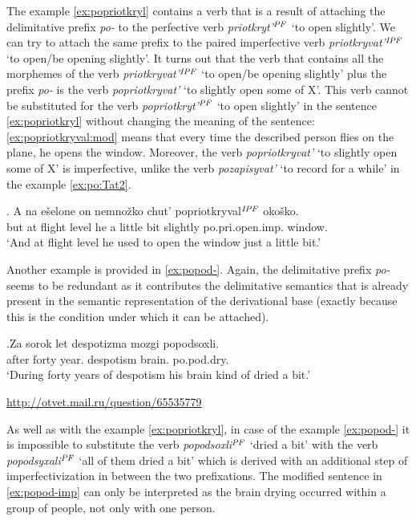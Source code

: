 The example \ref{ex:popriotkryl} contains a verb that is a result of attaching the delimitative prefix \textit{po-} to the perfective verb \textit{priotkryt'$^{\mathit{PF}}$} `to open slightly'. We can try to attach the same prefix to the paired imperfective verb \textit{priotkryvat'}$^{\mathit{IPF}}$ `to open/be opening slightly'. It turns out that the verb that contains all the morphemes of the verb \textit{priotkryvat'}$^{\mathit{IPF}}$ `to open/be opening slightly' plus the prefix \textit{po-} is the verb \textit{popriotkryvat'} `to slightly open some of X'. This verb cannot be substituted for the verb \textit{popriotkryt'}$^{\mathit{PF}}$ `to open slightly' in the sentence \ref{ex:popriotkryl} without changing the meaning of the sentence: \ref{ex:popriotkryval:mod} means that every time the described person flies on the plane, he opens the window. Moreover, the verb \textit{popriotkryvat'} `to slightly open some of X' is imperfective, unlike the verb \textit{pozapisyvat'} `to record for a while' in the example \ref{ex:po:Tat2}.

\exg. \label{ex:popriotkryval:mod}A na e\v{s}elone on nemno\v{z}ko chut' popriotkryval$^{\mathit{IPF}}$ oko\v{s}ko.\\
but at {flight level} he {a little bit} {slightly} po.pri.open.imp. window.\\
\vspace{0.5em}
`And at flight level he used to open the window just a little bit.'

Another example is provided in \ref{ex:popod-}. Again, the delimitative prefix \textit{po-} seems to be redundant as it contributes the delimitative semantics that is already present in the semantic representation of the derivational base (exactly because this is the condition under which it can be attached).

\exg.\label{ex:popod-}Za sorok let despotizma mozgi popodsoxli.\\
after forty year. despotism brain. po.pod.dry.\\
\vspace{0.5em}
`During forty years of despotism his brain kind of dried a bit.'
\begin{flushright}
\vspace{-1em}
\url{http://otvet.mail.ru/question/65535779}
\end{flushright}

As well as with the example \ref{ex:popriotkryl}, in case of the example \ref{ex:popod-} it is impossible to substitute the verb \textit{popodsoxli}$^{\mathit{PF}}$ `dried a bit' with the verb \textit{popodsyxali}$^{\mathit{PF}}$ `all of them dried a bit' which is derived with an additional step of imperfectivization in between the two prefixations. The modified sentence in \ref{ex:popod-imp} can only be interpreted as the brain drying occurred within a group of people, not only with one person.  

